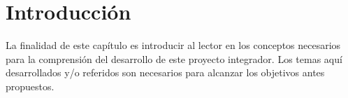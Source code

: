 \section{Introducción}

La finalidad de este capítulo es introducir al lector en los conceptos
necesarios para la comprensión del desarrollo de este proyecto integrador.
Los temas aquí desarrollados y/o referidos son necesarios para alcanzar los
objetivos antes propuestos.
